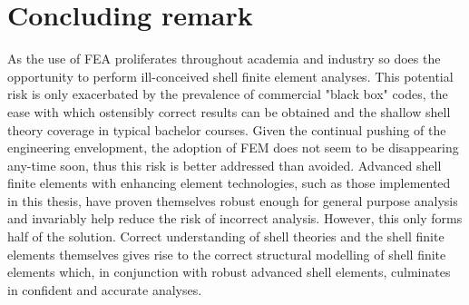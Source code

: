 \section{Concluding remark}

As the use of FEA proliferates throughout academia and industry so does the opportunity to perform ill-conceived shell finite element analyses. This potential risk is only exacerbated by the prevalence of commercial "black box" codes, the ease with which ostensibly correct results can be obtained and the shallow shell theory coverage in typical bachelor courses. Given the continual pushing of the engineering envelopment, the adoption of FEM does not seem to be disappearing any-time soon, thus this risk is better addressed than avoided. Advanced shell finite elements with enhancing element technologies, such as those implemented in this thesis, have proven themselves robust enough for general purpose analysis and invariably help reduce the risk of incorrect analysis. However, this only forms half of the solution. Correct understanding of shell theories and the shell finite elements themselves gives rise to the correct structural modelling of shell finite elements which, in conjunction with robust advanced shell elements, culminates in confident and accurate analyses.